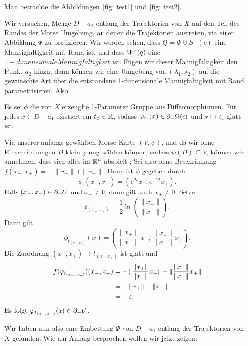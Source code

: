 \begin{bigproof}
    Man betrachte die Abbildungen~\ref{fig: test1} und~\ref{fig: test2}.

    Wir versuchen, Menge $D - a_1$ entlang der Trajektorien von $X$ auf den Teil des Randes der Morse 
    Umgebung, an denen die Trajektorien austreten, via einer Abbildung $\Phi$ zu projizieren. Wir werden
    sehen, dass $Q = \Phi \cup S_+(c)$ eine Mannigfaltigkeit mit Rand ist, und dass ${ W^s } (q)$ eine 
    $1-dimensionale Mannigfaltigkeit$ ist. Fügen wir dieser Mannigfaltigkeit den Punkt $a_2$ hinzu, dann
    können wir eine Umgebung von $(\lambda_1, \lambda_2)$ auf die gewünschte Art über die entstandene
    1-dimensionale Mannigfaltigkeit mit Rand parametrisieren. Also:

    \begin{claim}
        Es sei $\phi$ die von $X$ erzeugfte 1-Parameter Gruppe aus Diffeomorphismen. Für jedes 
        $x \in D - a_1$ existiert ein $t_x \in { \mathbb R }$, sodass $\varphi_{t_x} (x) \in { \partial }_- \Omega (c)$
        und $x \mapsto t_x$ glatt ist.
    \end{claim}

    \begin{smallproof}
        Via unserer anfangs gewählten Morse Karte $(V, \psi)$, und da wir ohne Einschränkungen $D$ 
        klein genug wählen können, sodass $\psi(D) \subseteq V$, können wir annehmen, dass sich alles im 
        ${ \mathbb R }^n$ abspielt ; Sei also ohne Beschränkung $f(x_-, x_+) = - \|x_-\| + \|x_+\|$. Dann ist 
        $\phi$ gegeben durch 
        \[ \phi_t(x_-, x_+) = (e^{2t}x_-, e^{-2t}x_+) . \]
        Falls $(x_-, x_+) \in { \partial }_+ U$ und $x_- \neq 0$, dann gilt auch $x_+ \neq 0$. Setze
        \[ t_{(x_-, x_+)} = \frac{1}{2} \ln \left( \frac{\| x_+ \|}{\| x_- \|} \right) . \]
        Dann gilt
        \[ \phi_{t_{(x_-, x_+)}} (x) = 
            \left( \frac{\| x_+ \|}{\| x_- \|} x_-, \frac{\| x_- \|}{\| x_+ \|} x_+ \right) . \]
        Die Zuordnung $(x_-, x_+) \mapsto t_{(x_-, x_+)}$ ist glatt und 
        \begin{align*}
            f(\varphi_{t_{(x_-, x_+)}})(x_-, x_+) = & - \| \frac{\| x_+ \|}{\| x_- \|} x_- \|
                +  \| \frac{\| x_- \|}{\| x_+ \|} x_+ \| \\
                = & - \| x_+ \| + \| x_- \| \\
                = & - \varepsilon .
        \end{align*}
        Es folgt $\varphi_{t_{(x_-, x_+)}} (x) \in { \partial }_- U$.
    \end{smallproof}

    Wir haben nun also eine Einbettung $\Phi$ von $D - a_1$ entlang der Trajektorien von $X$ gefunden.
    Wie am Anfang besprochen wollen wir jetzt zeigen:


\end{bigproof}
